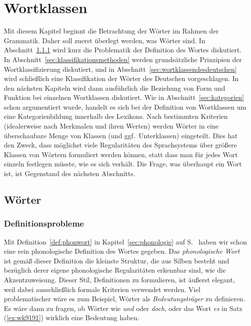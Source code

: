 \chapter{Wortklassen}

\label{sec:wortklassen}

Mit diesem Kapitel beginnt die Betrachtung der Wörter im Rahmen der Grammatik.
Daher soll zuerst überlegt werden, was Wörter sind.
In Abschnitt~\ref{sec:definitionsproblemewort} wird kurz die Problematik der Definition des Wortes diskutiert.
In Abschnitt~\ref{sec:klassifikationsmethoden} werden grundsätzliche Prinzipien der Wortklassifizierung diskutiert, und in Abschnitt~\ref{sec:wortklassendesdeutschen} wird schließlich eine Klassifikation der Wörter des Deutschen vorgeschlagen.
In den nächsten Kapiteln wird dann ausführlich die Beziehung von Form und Funktion bei einzelnen Wortklassen diskutiert.
Wie in Abschnitt~\ref{sec:kategorien} schon argumentiert wurde, handelt es sich bei der Definition von Wortklassen um eine Kategorienbildung innerhalb des Lexikons.
Nach bestimmten Kriterien (idealerweise nach Merkmalen und ihren Werten) werden Wörter in eine überschaubare Menge von Klassen (und ggf.\ Unterklassen) eingeteilt.
Dies hat den Zweck, dass möglichst viele Regularitäten des Sprachsystems über größere Klassen von Wörtern formuliert werden können, statt dass man für jedes Wort einzeln festlegen müsste, wie es sich verhält.
Die Frage, was überhaupt ein Wort ist, ist Gegenstand des nächsten Abschnitts.

\section{Wörter}

\label{sec:woerter}

\subsection{Definitionsprobleme}

\label{sec:definitionsproblemewort}


Mit Definition~\ref{def:phonwort} in Kapitel~\ref{sec:phonologie} auf S.~\pageref{def:phonwort} haben wir schon eine rein phonologische Definition des Wortes gegeben.
Das \textit{phonologische Wort} ist gemäß dieser Definition die kleinste Struktur, die aus Silben besteht und bezüglich derer eigene phonologische Regularitäten erkennbar sind, wie \zB die Akzentzuweisung.
Dieser Stil, Definitionen zu formulieren, ist äußerst elegant, weil dabei ausschließlich formale Kriterien verwendet werden.
Viel problematischer wäre es zum Beispiel, Wörter als \textit{Bedeutungsträger} zu definieren.
Es wäre dann zu fragen, ob Wörter wie \textit{und} oder \textit{doch}, oder das Wort \textit{es} in Satz (\ref{ex:wk9191}) wirklich eine Bedeutung haben.

